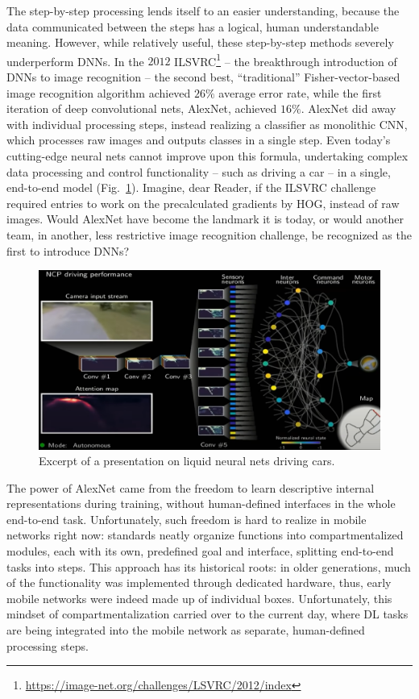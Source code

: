 			The step-by-step processing lends itself to an easier understanding, because the data communicated between the steps has a logical, human understandable meaning.
			However, while relatively useful, these step-by-step methods severely underperform \acp{DNN}.
			In the $2012$ \ac{ILSVRC}\footnote{\url{https://image-net.org/challenges/LSVRC/2012/index}} -- the breakthrough introduction of \acp{DNN} to image recognition -- the second best, ``traditional'' Fisher-vector-based image recognition algorithm achieved $26\%$ average error rate, while the first iteration of deep convolutional nets, AlexNet, achieved $16\%$.
			AlexNet did away with individual processing steps, instead realizing a classifier as monolithic \ac{CNN}, which processes raw images and outputs classes in a single step.
			Even today's cutting-edge neural nets cannot improve upon this formula, undertaking complex data processing and control functionality -- such as driving a car -- in a single, end-to-end model (Fig.~\ref{fig:liquid_nn}).
			Imagine, dear Reader, if the \ac{ILSVRC} challenge required entries to work on the precalculated gradients by \ac{HOG}, instead of raw images.
			Would AlexNet have become the landmark it is today, or would another team, in another, less restrictive image recognition challenge, be recognized as the first to introduce \acp{DNN}?
			
			\begin{figure}[ht]
				\centering
				\includegraphics[width=0.8\linewidth]{figures/12_imputation/liquid_nn/liquid_nn.png}
				\caption[Excerpt of a presentation on liquid neural nets driving cars.]{Excerpt of a presentation on liquid neural nets driving cars\footnotemark.}
				\label{fig:liquid_nn}
			\end{figure}
			
			The power of AlexNet came from the freedom to learn descriptive internal representations during training, without human-defined interfaces in the whole end-to-end task.
			Unfortunately, such freedom is hard to realize in mobile networks right now: standards neatly organize functions into compartmentalized modules, each with its own, predefined goal and interface, splitting end-to-end tasks into steps.
			This approach has its historical roots: in older generations, much of the functionality was implemented through dedicated hardware, thus, early mobile networks were indeed made up of individual boxes.
			Unfortunately, this mindset of compartmentalization carried over to the current day, where \ac{DL} tasks are being integrated into the mobile network as separate, human-defined processing steps.
			
